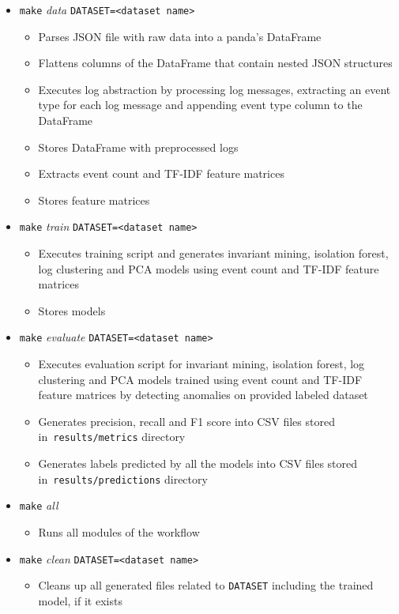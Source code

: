  \begin{itemize}
     \item \texttt{make} \textit{data} \texttt{DATASET=<dataset name>}
     \begin{itemize}
         \item Parses JSON file with raw data into a panda's DataFrame
         \item Flattens columns of the DataFrame that contain nested JSON structures
         \item Executes log abstraction by processing log messages, extracting an event type for each log message and appending event type column to the DataFrame
         \item Stores DataFrame with preprocessed logs 
         \item Extracts event count and TF-IDF feature matrices
         \item Stores feature matrices
     \end{itemize}
     \item \texttt{make} \textit{train} \texttt{DATASET=<dataset name>}
     \begin{itemize}
         \item Executes training script and generates invariant mining, isolation forest, log clustering and PCA models using event count and TF-IDF feature matrices
         \item Stores models
     \end{itemize}
     \item \texttt{make} \textit{evaluate} \texttt{DATASET=<dataset name>}
     \begin{itemize}
         \item Executes evaluation script for invariant mining, isolation forest, log clustering and PCA models trained using event count and TF-IDF feature matrices by detecting anomalies on provided labeled dataset
         \item Generates precision, recall and F1 score into CSV files stored in~\texttt{results/metrics} directory
         \item Generates labels predicted by all the models into CSV files stored in~\texttt{results/predictions} directory
     \end{itemize}
     \item \texttt{make} \textit{all} 
     \begin{itemize}
         \item Runs all modules of the workflow
     \end{itemize}
     \item \texttt{make} \textit{clean} \texttt{DATASET=<dataset name>}
     \begin{itemize}
         \item Cleans up all generated files related to \texttt{DATASET} including the trained model, if it exists
     \end{itemize}
 \end{itemize}
 
